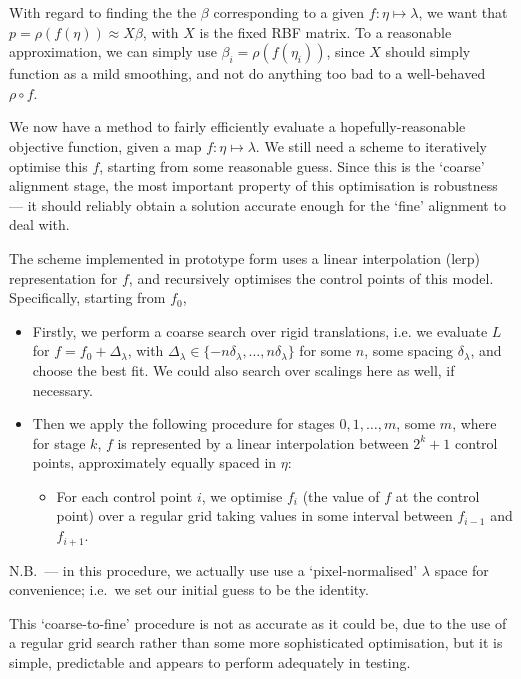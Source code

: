 With regard to finding the the $\beta$ corresponding to a given $f :
\eta \mapsto \lambda$, we want that $p = \rho (f (\eta)) \approx X
\beta$, with $X$ is the fixed RBF matrix. To a reasonable approximation,
we can simply use $\beta_i= \rho (f (\eta_i))$, since $X$ should
simply function as a mild smoothing, and not do anything too bad to a
well-behaved $\rho \circ f$. 

We now have a method to fairly efficiently evaluate a
hopefully-reasonable objective function, given a map $f : \eta \mapsto
\lambda$. We still need a scheme to iteratively optimise this $f$,
starting from some reasonable guess. Since this is the `coarse'
alignment stage, the most important property of this optimisation is
robustness --- it should reliably obtain a solution accurate enough for
the `fine' alignment to deal with.

The scheme implemented in prototype form uses a linear interpolation (lerp)
representation for $f$, and recursively optimises the control points of this
model. Specifically, starting from $f_0$,
\begin{itemize}
\item Firstly, we perform a coarse search over rigid translations, i.e.
we evaluate $L$ for $f = f_0 + \Delta_\lambda$, with $\Delta_\lambda
\in \{-n \delta_\lambda, \dots , n \delta_\lambda\}$ for some $n$, some
spacing $\delta_\lambda$, and choose the best fit. We could also search
over scalings here as well, if necessary.
\item Then we apply the following procedure for stages $0,1,\dots,m$,
some $m$, where for stage $k$, $f$ is represented by a linear
interpolation between $2^k + 1$ control points, approximately equally
spaced in
$\eta$:
\begin{itemize}
\item For each control point $i$, we optimise $f_i$ (the value of $f$ at
the control point) over a regular grid taking values in some interval between $f_{i-1}$
and $f_{i+1}$.
\end{itemize}
\end{itemize}

N.B.\ --- in this procedure, we actually use use a `pixel-normalised'
$\lambda$ space for convenience; i.e.\ we set our initial guess to be the
identity.

This `coarse-to-fine' procedure is not as accurate as it could be, due
to the use of a regular grid search rather than some more sophisticated
optimisation, but it is simple, predictable and appears to perform
adequately in testing.


